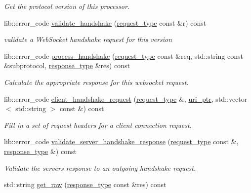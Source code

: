 \begin{DoxyCompactItemize}
\begin{DoxyCompactList}\small\item\em Get the protocol version of this processor. \end{DoxyCompactList}\item 
lib\+::error\+\_\+code \hyperlink{classwebsocketpp_1_1processor_1_1hybi00_a9458e35fabf2b39bd9e09523ad60c22c}{validate\+\_\+handshake} (\hyperlink{classwebsocketpp_1_1http_1_1parser_1_1request}{request\+\_\+type} const \&r) const
\begin{DoxyCompactList}\small\item\em validate a Web\+Socket handshake request for this version \end{DoxyCompactList}\item 
lib\+::error\+\_\+code \hyperlink{classwebsocketpp_1_1processor_1_1hybi00_a29c4300aa053e7028ee5a46601319afd}{process\+\_\+handshake} (\hyperlink{classwebsocketpp_1_1http_1_1parser_1_1request}{request\+\_\+type} const \&req, std\+::string const \&subprotocol, \hyperlink{classwebsocketpp_1_1http_1_1parser_1_1response}{response\+\_\+type} \&res) const
\begin{DoxyCompactList}\small\item\em Calculate the appropriate response for this websocket request. \end{DoxyCompactList}\item 
lib\+::error\+\_\+code \hyperlink{classwebsocketpp_1_1processor_1_1hybi00_a5f88e94fc52da9be8ba718889b5c093f}{client\+\_\+handshake\+\_\+request} (\hyperlink{classwebsocketpp_1_1http_1_1parser_1_1request}{request\+\_\+type} \&, \hyperlink{namespacewebsocketpp_aae370ea5ac83a8ece7712cb39fc23f5b}{uri\+\_\+ptr}, std\+::vector$<$ std\+::string $>$ const \&) const
\begin{DoxyCompactList}\small\item\em Fill in a set of request headers for a client connection request. \end{DoxyCompactList}\item 
lib\+::error\+\_\+code \hyperlink{classwebsocketpp_1_1processor_1_1hybi00_a8c7e9edc5eec497d908095ab7a848f2e}{validate\+\_\+server\+\_\+handshake\+\_\+response} (\hyperlink{classwebsocketpp_1_1http_1_1parser_1_1request}{request\+\_\+type} const \&, \hyperlink{classwebsocketpp_1_1http_1_1parser_1_1response}{response\+\_\+type} \&) const
\begin{DoxyCompactList}\small\item\em Validate the server\textquotesingle{}s response to an outgoing handshake request. \end{DoxyCompactList}\item 
std\+::string \hyperlink{classwebsocketpp_1_1processor_1_1hybi00_a100419fa981b2f464a9e102594b9e124}{get\+\_\+raw} (\hyperlink{classwebsocketpp_1_1http_1_1parser_1_1response}{response\+\_\+type} const \&res) const\hypertarget{classwebsocketpp_1_1processor_1_1hybi00_a100419fa981b2f464a9e102594b9e124}{}\label{classwebsocketpp_1_1processor_1_1hybi00_a100419fa981b2f464a9e102594b9e124}


\end{DoxyCompactItemize}
